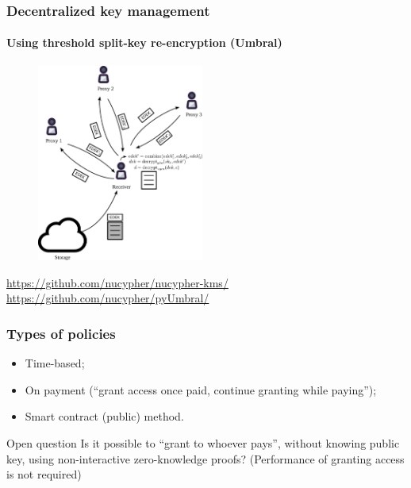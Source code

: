 \documentclass[xetex,mathsans,sans,aspectratio=169]{beamer}
\begin{document}
    \begin{frame}
        \frametitle{Decentralized key management}
        \framesubtitle{Using threshold split-key re-encryption (Umbral)}
        \begin{figure}
            \centering
            \includegraphics[height=6.5cm]{pdf/decrypt-umbral.pdf}
        \end{figure}
        \url{https://github.com/nucypher/nucypher-kms/}
        \url{https://github.com/nucypher/pyUmbral/}
    \end{frame}

    \begin{frame}
        \frametitle{Types of policies}
        \begin{itemize}
            \item Time-based;
            \item On payment (``grant access once paid, continue granting while paying'');
            \item Smart contract (public) method.
        \end{itemize}

        \begin{block}{Open question}
            Is it possible to ``grant to whoever pays'', without knowing public key, using non-interactive zero-knowledge proofs?
            (Performance of granting access is not required)
        \end{block}
    \end{frame}
\end{document}
